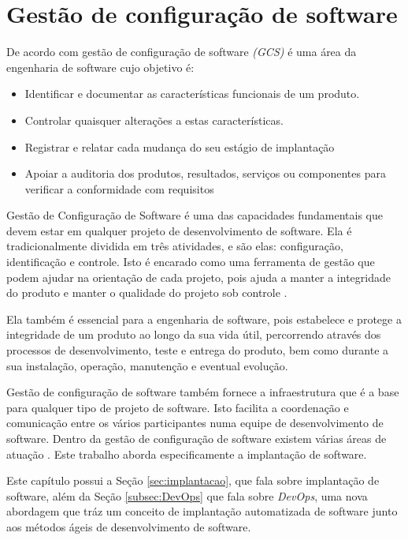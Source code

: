 \chapter{Gestão de configuração de software}
\label{cap-referencial}

De acordo com  gestão de configuração de software \textit{(GCS)} 
é uma área da engenharia de software cujo objetivo é:

\begin{itemize}
  \item Identificar e documentar as características funcionais de
  um produto.
  \item Controlar quaisquer alterações a estas características.
  \item Registrar e relatar cada mudança do seu estágio de implantação
  \item Apoiar a auditoria dos produtos, resultados, serviços ou
componentes para verificar a conformidade com requisitos

\end{itemize}

Gestão de Configuração de Software é uma das capacidades fundamentais que devem
estar em qualquer projeto de desenvolvimento de software. Ela é
tradicionalmente dividida em três atividades, e são elas: configuração,
identificação e controle. Isto é encarado como uma ferramenta de
gestão que podem ajudar na orientação de cada projeto, pois ajuda a manter a
integridade do produto e manter o qualidade do projeto sob controle \cite{gcs}. 

Ela também é essencial para a engenharia de software, pois estabelece e protege a
integridade de um produto ao longo da sua vida útil, percorrendo através dos
processos de desenvolvimento, teste e entrega do produto, bem como
durante a sua instalação, operação, manutenção e eventual evolução\cite{ieegcs}.

Gestão de configuração de software também fornece a infraestrutura que é a base para
qualquer tipo de projeto de software. Isto facilita a coordenação e comunicação
entre os vários participantes numa equipe de desenvolvimento de software.
Dentro da gestão de configuração de software
existem várias áreas de atuação \cite{gcs}. Este trabalho aborda especificamente a 
implantação de software.

Este capítulo possui a Seção \ref{sec:implantacao}, que fala sobre
implantação de software, além da Seção \ref{subsec:DevOps} que fala sobre 
\textit{DevOps}, uma
nova abordagem que tráz um conceito de implantação
automatizada de software junto aos métodos ágeis de desenvolvimento de software. 

